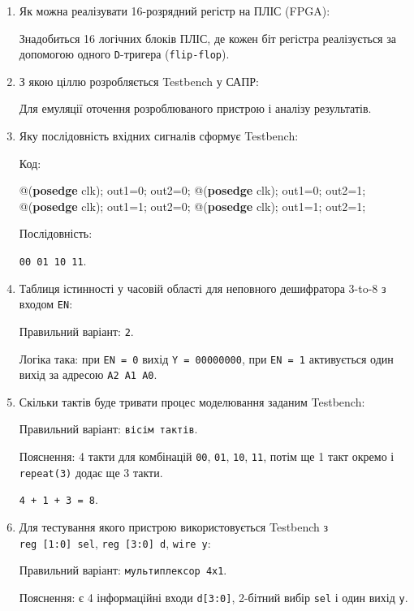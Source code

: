 \documentclass[
  11pt,
]{article}
\newenvironment{Shaded}{}{}
\newcommand{\DecValTok}[1]{\textcolor[rgb]{0.25,0.63,0.44}{#1}}
\newcommand{\KeywordTok}[1]{\textcolor[rgb]{0.00,0.44,0.13}{\textbf{#1}}}
\newcommand{\NormalTok}[1]{#1}
\newcommand{\OperatorTok}[1]{\textcolor[rgb]{0.40,0.40,0.40}{#1}}
\begin{document}
\begin{enumerate}
\def\labelenumi{\arabic{enumi}.}
\setcounter{enumi}{14}
\item
  Як можна реалізувати 16-розрядний регістр на ПЛІС (FPGA):

  Знадобиться 16 логічних блоків ПЛІС, де кожен біт регістра реалізується за допомогою одного \texttt{D}-тригера (\texttt{flip-flop}).
\item
  З якою ціллю розробляється Testbench у САПР:

  Для емуляції оточення розроблюваного пристрою і аналізу результатів.
\item
  Яку послідовність вхідних сигналів сформує Testbench:

  Код:

\begin{Shaded}
\begin{Highlighting}[]
\OperatorTok{@(}\KeywordTok{posedge}\NormalTok{ clk}\OperatorTok{);}\NormalTok{ out1}\OperatorTok{=}\DecValTok{0}\OperatorTok{;}\NormalTok{ out2}\OperatorTok{=}\DecValTok{0}\OperatorTok{;}
\OperatorTok{@(}\KeywordTok{posedge}\NormalTok{ clk}\OperatorTok{);}\NormalTok{ out1}\OperatorTok{=}\DecValTok{0}\OperatorTok{;}\NormalTok{ out2}\OperatorTok{=}\DecValTok{1}\OperatorTok{;}
\OperatorTok{@(}\KeywordTok{posedge}\NormalTok{ clk}\OperatorTok{);}\NormalTok{ out1}\OperatorTok{=}\DecValTok{1}\OperatorTok{;}\NormalTok{ out2}\OperatorTok{=}\DecValTok{0}\OperatorTok{;}
\OperatorTok{@(}\KeywordTok{posedge}\NormalTok{ clk}\OperatorTok{);}\NormalTok{ out1}\OperatorTok{=}\DecValTok{1}\OperatorTok{;}\NormalTok{ out2}\OperatorTok{=}\DecValTok{1}\OperatorTok{;}
\end{Highlighting}
\end{Shaded}

  Послідовність:

  \texttt{00\ 01\ 10\ 11}.
\item
  Таблиця істинності у часовій області для неповного дешифратора 3-to-8 з входом \texttt{EN}:

  Правильний варіант: \texttt{2}.

  Логіка така: при \texttt{EN\ =\ 0} вихід \texttt{Y\ =\ 00000000}, при \texttt{EN\ =\ 1} активується один вихід за адресою \texttt{A2\ A1\ A0}.
\item
  Скільки тактів буде тривати процес моделювання заданим Testbench:

  Правильний варіант: \texttt{вісім\ тактів}.

  Пояснення: 4 такти для комбінацій \texttt{00}, \texttt{01}, \texttt{10}, \texttt{11}, потім ще 1 такт окремо і \texttt{repeat(3)} додає ще 3 такти.

  \texttt{4\ +\ 1\ +\ 3\ =\ 8}.
\item
  Для тестування якого пристрою використовується Testbench з \texttt{reg\ {[}1:0{]}\ sel}, \texttt{reg\ {[}3:0{]}\ d}, \texttt{wire\ y}:

  Правильний варіант: \texttt{мультиплексор\ 4x1}.

  Пояснення: є 4 інформаційні входи \texttt{d{[}3:0{]}}, 2-бітний вибір \texttt{sel} і один вихід \texttt{y}.
\end{enumerate}
\end{document}
